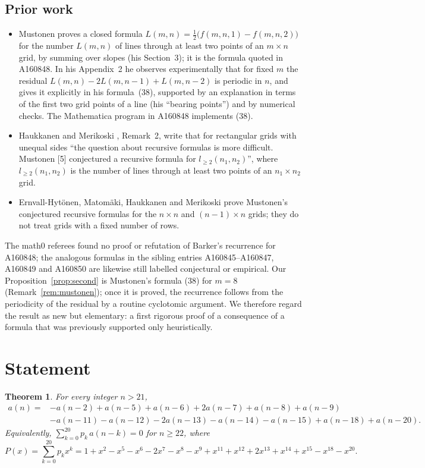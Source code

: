 \documentclass[11pt]{amsart}
\theoremstyle{plain}
\newtheorem{theorem}{Theorem}
\theoremstyle{definition}
\begin{document}
\subsection*{Prior work}
\begin{itemize}
\item Mustonen \cite{Mustonen} proves a closed formula $L(m,n)=\tfrac12\bigl(f(m,n,1)-f(m,n,2)\bigr)$ for the number $L(m,n)$ of lines through at least two points of an $m\times n$ grid, by summing over slopes (his Section~3); it is the formula quoted in A160848. In his Appendix~2 he observes experimentally that for fixed $m$ the residual $L(m,n)-2L(m,n-1)+L(m,n-2)$ is periodic in $n$, and gives it explicitly in his formula~(38), supported by an explanation in terms of the first two grid points of a line (his ``bearing points'') and by numerical checks. The Mathematica program in A160848 implements (38).
\item Haukkanen and Merikoski \cite{HM}, Remark~2, write that for rectangular grids with unequal sides ``the question about recursive formulas is more difficult. Mustonen [5] conjectured a recursive formula for $l_{\ge2}(n_1,n_2)$'', where $l_{\ge2}(n_1,n_2)$ is the number of lines through at least two points of an $n_1\times n_2$ grid.
\item Ernvall-Hytönen, Matomäki, Haukkanen and Merikoski \cite{EMHM} prove Mustonen's conjectured recursive formulas for the $n\times n$ and $(n-1)\times n$ grids; they do not treat grids with a fixed number of rows.
\end{itemize}
The math0 referees found no proof or refutation of Barker's recurrence for A160848; the analogous formulas in the sibling entries A160845--A160847, A160849 and A160850 are likewise still labelled conjectural or empirical. Our Proposition~\ref{prop:second} is Mustonen's formula (38) for $m=8$ (Remark~\ref{rem:mustonen}); once it is proved, the recurrence follows from the periodicity of the residual by a routine cyclotomic argument. We therefore regard the result as new but elementary: a first rigorous proof of a consequence of a formula that was previously supported only heuristically.

\section{Statement}\label{sec:statement}

\begin{theorem}\label{thm:main}
For every integer $n>21$,
\[
\begin{aligned}
a(n)={}&-a(n-2)+a(n-5)+a(n-6)+2a(n-7)+a(n-8)+a(n-9)\\
&-a(n-11)-a(n-12)-2a(n-13)-a(n-14)-a(n-15)+a(n-18)+a(n-20).
\end{aligned}
\]
Equivalently, $\sum_{k=0}^{20}p_k\,a(n-k)=0$ for $n\ge22$, where
\[
P(x)=\sum_{k=0}^{20}p_kx^k=1+x^2-x^5-x^6-2x^7-x^8-x^9+x^{11}+x^{12}+2x^{13}+x^{14}+x^{15}-x^{18}-x^{20}.
\]
\end{theorem}
\end{document}
